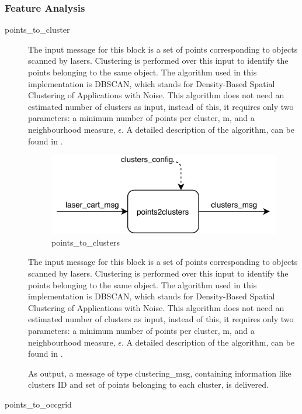 \subsubsection{Feature Analysis}
\begin{description}
\item[points\_to\_cluster] \hfill

The input message for this block is a set of points corresponding to objects scanned by lasers. Clustering is performed over this input to identify the points belonging to the same object. The algorithm used in this implementation is DBSCAN, which stands for Density-Based Spatial Clustering of Applications with Noise. This algorithm does not need an estimated number of clusters as input, instead of this, it requires only two parameters: a minimum number of points per cluster, m, and a neighbourhood measure, $\epsilon$. A detailed description of the algorithm, can be found in \cite{Ester96}.

\begin{figure}[ht!]
\centering
\includegraphics[scale=1]{fig/3/points_to_clusters.pdf}
\caption{points\_to\_clusters}
\label{points_to_clusters}
\end{figure}

The input message for this block is a set of points corresponding to objects scanned by lasers. Clustering is performed over this input to identify the points belonging to the same object. The algorithm used in this implementation is DBSCAN, which stands for Density-Based Spatial Clustering of Applications with Noise. This algorithm does not need an estimated number of clusters as input, instead of this, it requires only two parameters: a minimum number of points per cluster, m, and a neighbourhood measure, $\epsilon$. A detailed description of the algorithm, can be found in \cite{Ester96}.

As output, a message of type clustering\_msg, containing information like clusters ID and set of points belonging to each cluster, is delivered.

\item[points\_to\_occgrid] \hfill


\end{description}
